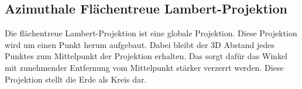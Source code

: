 \subsection{Azimuthale Flächentreue Lambert-Projektion}
\label{sec:lamflach}
Die flächentreue Lambert-Projektion ist eine globale Projektion. Diese Projektion wird um einen Punkt 
herum aufgebaut. Dabei bleibt der 3D Abstand jedes Punktes zum Mittelpunkt der Projektion erhalten.
Das sorgt dafür das Winkel mit zunehmender Entfernung vom Mittelpunkt stärker verzerrt werden. 
Diese Projektion stellt die Erde als Kreis dar.